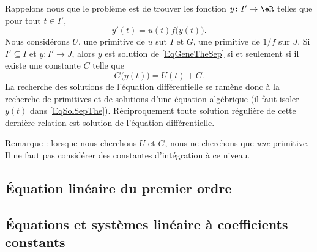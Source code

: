 Rappelons nous que le problème est de trouver les fonction $y\colon I'\to \eR$ telles que pour tout $t \in I'$,
\begin{equation}
	y'(t)=u(t)f\big( y(t) \big).
\end{equation}
Nous considérons $U$, une primitive de $u$ sut $I$ et $G$, une primitive de $1/f$ sur $J$. Si $I'\subseteq I$ et $y\colon I'\to J$, alors $y$ est solution de \eqref{EqGeneTheSep} si et seulement si il existe une constante $C$ telle que
\begin{equation}		\label{EqSolSepThe}
	G\big( y(t) \big)=U(t)+C.
\end{equation}
La recherche des solutions de l'équation différentielle se ramène donc à la recherche de primitives et de solutions d'une équation algébrique (il faut isoler $y(t)$ dans \eqref{EqSolSepThe}). Réciproquement toute solution régulière de cette dernière relation est solution de l'équation différentielle.

Remarque : lorsque nous cherchons $U$ et $G$, nous ne cherchons que \emph{une} primitive. Il ne faut pas considérer des constantes d'intégration à ce niveau.


					\subsection{Équation linéaire du premier ordre}


					\subsection{Équations et systèmes linéaire à coefficients constants}

